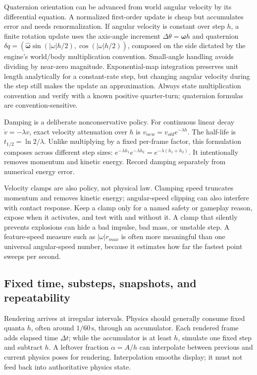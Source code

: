 Quaternion orientation can be advanced from world angular velocity by its differential equation. A normalized first-order update is cheap but accumulates error and needs renormalization. If angular velocity is constant over step \(h\), a finite rotation update uses the axis-angle increment \(\Delta\theta=\boldsymbol\omega h\) and quaternion \(\delta q=(\hat{\boldsymbol\omega}\sin(|\omega|h/2),\cos(|\omega|h/2))\), composed on the side dictated by the engine's world/body multiplication convention. Small-angle handling avoids dividing by near-zero magnitude. Exponential-map integration preserves unit length analytically for a constant-rate step, but changing angular velocity during the step still makes the update an approximation. Always state multiplication convention and verify with a known positive quarter-turn; quaternion formulas are convention-sensitive.

Damping is a deliberate nonconservative policy. For continuous linear decay \(\dot v=-\lambda v\), exact velocity attenuation over \(h\) is \(v_{new}=v_{old}e^{-\lambda h}\). The half-life is \(t_{1/2}=\ln2/\lambda\). Unlike multiplying by a fixed per-frame factor, this formulation composes across different step sizes: \(e^{-\lambda h_1}e^{-\lambda h_2}=e^{-\lambda(h_1+h_2)}\). It intentionally removes momentum and kinetic energy. Record damping separately from numerical energy error.

Velocity clamps are also policy, not physical law. Clamping speed truncates momentum and removes kinetic energy; angular-speed clipping can also interfere with contact response. Keep a clamp only for a named safety or gameplay reason, expose when it activates, and test with and without it. A clamp that silently prevents explosions can hide a bad impulse, bad mass, or unstable step. A feature-speed measure such as \(|\omega|r_{max}\) is often more meaningful than one universal angular-speed number, because it estimates how far the fastest point sweeps per second.

\subsection{Fixed time, substeps, snapshots, and repeatability}\label{06-engine-ii-ch034-fixed-time-substeps-snapshots-and-repeatability}

Rendering arrives at irregular intervals. Physics should generally consume fixed quanta \(h\), often around \(1/60\,\mathrm s\), through an accumulator. Each rendered frame adds elapsed time \(\Delta t\); while the accumulator is at least \(h\), simulate one fixed step and subtract \(h\). A leftover fraction \(\alpha=A/h\) can interpolate between previous and current physics poses for rendering. Interpolation smooths display; it must not feed back into authoritative physics state.

